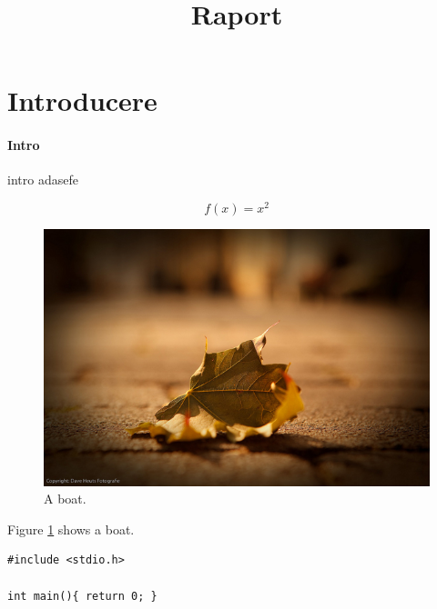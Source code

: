 \documentclass[11pt]{article}
\title{Raport}
\date{\parbox{\linewidth}{\centering%
	    Solcovenco Liviu. \hspace*{3cm} Turcan Ana.\endgraf\medskip
	    Dept.\ of Physics \endgraf
	    ABC College}
}
\begin{document}
\maketitle
\newpage
{}

\section{Introducere}
\paragraph{Intro} intro adasefe

\begin{equation}
	f(x) = x^2
\end{equation}

\begin{figure}
	\includegraphics[width=\linewidth]{sample.jpg}
	\caption{A boat.}
	\label{fig:boat1}
\end{figure}

Figure \ref{fig:boat1} shows a boat.


\begin{lstlisting}
#include <stdio.h>

int main(){ return 0; }
\end{lstlisting}
\end{document}
